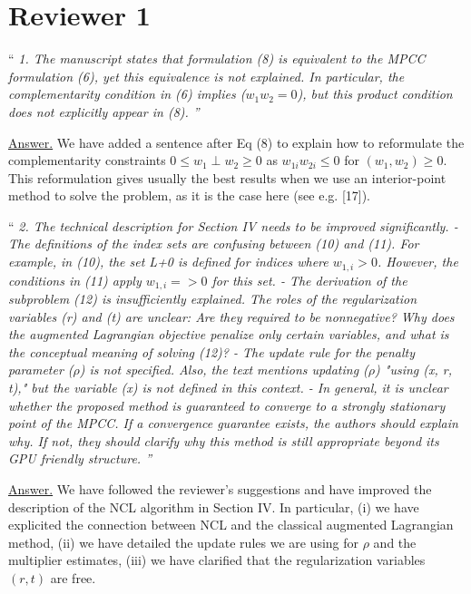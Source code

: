 \documentclass[10pt,a4paper]{article}
\newenvironment{quotereviewer}{\vspace{.5cm}{\underline\reviewername} ``\it\footnotesize}{''}
\newcommand{\answer}{\vspace{1mm}\underline{Answer.} }
\begin{document}
\section{Reviewer 1}
\def\reviewername{Reviewer~\#1}
\bigskip

\begin{quotereviewer}
 1. The manuscript states that formulation (8) is equivalent to the MPCC formulation (6), yet this equivalence is not explained. In particular, the complementarity condition in (6) implies ($w_1w_2 = 0$), but this product condition does not explicitly appear in (8).
\end{quotereviewer}

\answer
We have added a sentence after Eq (8) to explain how to reformulate the complementarity constraints
$0 \leq w_1 \perp w_2 \geq 0$ as $w_{1i} w_{2i} \leq 0$ for $(w_1, w_2) \geq 0$.
This reformulation gives usually the best results when we use an interior-point
method to solve the problem, as it is the case here (see e.g. [17]).

\begin{quotereviewer}
 2. The technical description for Section IV needs to be improved significantly.
- The definitions of the index sets are confusing between (10) and (11). For example, in (10), the set L+0 is defined for indices where $w_{1,i} > 0$. However, the conditions in (11) apply $w_{1,i} => 0$ for this set.
- The derivation of the subproblem (12) is insufficiently explained. The roles of the regularization variables (r) and (t) are unclear: Are they required to be nonnegative? Why does the augmented Lagrangian objective penalize only certain variables, and what is the conceptual meaning of solving (12)?
- The update rule for the penalty parameter ($\rho$) is not specified. Also, the text mentions updating ($\rho$) "using (x, r, t)," but the variable (x) is not defined in this context.
- In general, it is unclear whether the proposed method is guaranteed to converge to a strongly stationary point of the MPCC. If a convergence guarantee exists, the authors should explain why. If not, they should clarify why this method is still appropriate beyond its GPU friendly structure.
\end{quotereviewer}

\answer
We have followed the reviewer's suggestions and have improved the description
of the NCL algorithm in Section IV.
In particular, (i) we have explicited the connection
between NCL and the classical augmented Lagrangian method, (ii) we have detailed
the update rules we are using for $\rho$ and the multiplier estimates, (iii) we have
clarified that the regularization variables $(r, t)$ are free.
\end{document}
